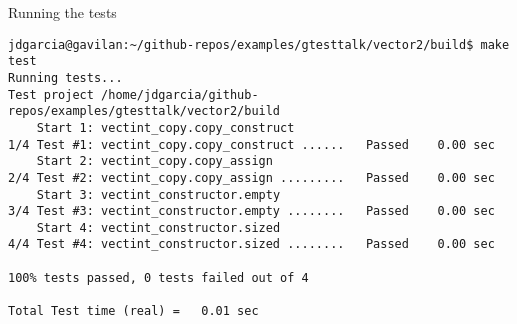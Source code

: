 \begin{frame}[t,fragile]{Running the tests}
\begin{lstlisting}[style=terminal]
jdgarcia@gavilan:~/github-repos/examples/gtesttalk/vector2/build$ make test
Running tests...
Test project /home/jdgarcia/github-repos/examples/gtesttalk/vector2/build
    Start 1: vectint_copy.copy_construct
1/4 Test #1: vectint_copy.copy_construct ......   Passed    0.00 sec
    Start 2: vectint_copy.copy_assign
2/4 Test #2: vectint_copy.copy_assign .........   Passed    0.00 sec
    Start 3: vectint_constructor.empty
3/4 Test #3: vectint_constructor.empty ........   Passed    0.00 sec
    Start 4: vectint_constructor.sized
4/4 Test #4: vectint_constructor.sized ........   Passed    0.00 sec

100% tests passed, 0 tests failed out of 4

Total Test time (real) =   0.01 sec
\end{lstlisting}
\end{frame}
